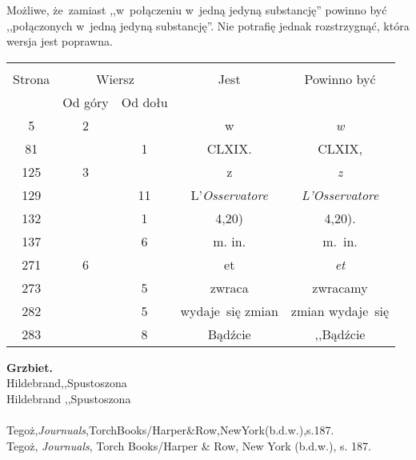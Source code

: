 \documentclass[a4paper,11pt]{article}
\begin{document}
\start {} Możliwe, że~zamiast ,,w~połączeniu w~jedną jedyną
substancję'' powinno być ,,połączonych w~jedną jedyną substancję''.
Nie potrafię jednak rozstrzygnąć, która wersja jest poprawna.

\vspace{\spaceFour}



\begin{center}
  \begin{tabular}{|c|c|c|c|c|}
    \hline
    & \multicolumn{2}{c|}{} & & \\
    Strona & \multicolumn{2}{c|}{Wiersz} & Jest
                              & Powinno być \\ \cline{2-3}
    & Od góry & Od dołu & & \\
    \hline
    5   &  2 & & w & \emph{w} \\
    81  & &  1 & CLXIX. & CLXIX, \\
    125 &  3 & & z & \emph{z} \\
    129 & & 11 & L'\emph{Osservatore} & \emph{L'Osservatore} \\
    132 & &  1 & 4,20) & 4,20). \\
    137 & &  6 & m.\hspace{1em} in. & m.~in.\\
    271 &  6 & & et & \emph{et} \\
    273 & &  5 & zwraca & zwracamy \\
    282 & &  5 & wydaje~się zmian & zmian wydaje~się \\
    283 & &  8 & Bądźcie & ,,Bądźcie  %
    \\
    \hline
  \end{tabular}
\end{center}
\noindent
\textbf{Grzbiet.} \\
\Jest Hildebrand,,Spustoszona \\ %
\Powin Hildebrand ,,Spustoszona \\ %
 \\
\Jest  Tegoż,\emph{Journuals},TorchBooks/Harper{\&}Row,NewYork(b.d.w.),s.187. \\
\Powin Tegoż, \emph{Journuals}, Torch Books/Harper \& Row, New York
(b.d.w.), s. 187. \\


\vspace{\spaceTwo}
\end{document}
